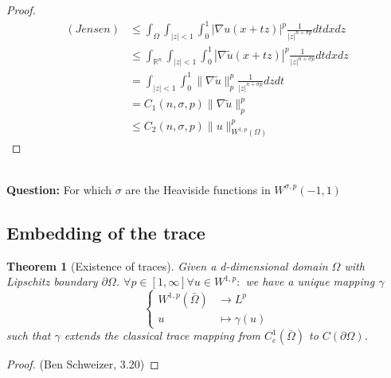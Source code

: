 \documentclass[a4paper,11pt,oneside,fleqn]{book}
\newtheorem{theorem}{Theorem}[section]
\theoremstyle{definition}
\theoremstyle{remark}
\begin{document}
\begin{proof}
\begin{align*}
  (Jensen)&\leq  \int_\Omega \int_{|z| < 1} \int_0^1 |\nabla u(x + tz)|^p 
  			\frac{1}{|z|^{n + \sigma p}} dt dx dz\\
  		& \leq \int_{\mathbb{R}^n} \int_{|z| < 1} \int_0^1 |\nabla \tilde{u}(x + tz)|^p 
  			\frac{1}{|z|^{n + \sigma p}} dt dx dz \\
  		& = \int_{|z| < 1} \int_0^1 \|\nabla \tilde{u}\|_p^p \frac{1}{|z|^{n + \sigma p}} dz dt \\
  		& = C_1(n, \sigma, p) \|\nabla \tilde{u}\|^p_p\\
  		& \leq C_2(n, \sigma, p) \|u\|_{W^{1,p}(\Omega)}^p
  	\end{align*}
\end{proof}
$\quad$\\
\textbf{Question:}
For which $\sigma$ are the Heaviside functions in $W^{\sigma, p}(-1, 1)$


\subsection{Embedding of the trace}
\begin{theorem}[Existence of traces]
	Given a d-dimensional domain $\Omega$ with Lipschitz boundary $\partial \Omega$. $\forall p \in [1, \infty] \forall u \in W^{1, p}:$ we have a unique mapping $\gamma$
	\begin{equation*}
	\left\{
	\begin{aligned}
		W^{1, p}(\bar{\Omega}) &\rightarrow L^p\\
		u &\mapsto \gamma(u) 
	\end{aligned}
	\right.	
	\end{equation*}
	such that $\gamma$ extends the classical trace mapping from $C^1_c(\bar{\Omega})$ to $C(\partial\Omega)$.
\end{theorem}
\begin{proof}(Ben Schweizer, 3.20)
	
\end{proof}
\end{document}
